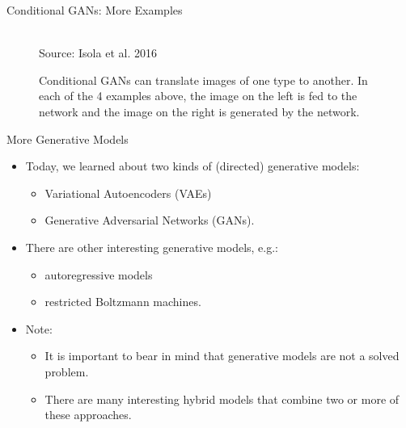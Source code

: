 \begin{frame} {Conditional GANs: More Examples}
  \begin{figure}
    \centering
       \tiny{\\Source: Isola et al. 2016}
       \caption{\footnotesize Conditional GANs can translate images of one type to another. In each of the 4 examples above, the image on the left is fed to the network and the image on the right is generated by the network.}
 \end{figure}
\end{frame}


\begin{frame} {More Generative Models}
  \begin{itemize}
   \vspace{8mm}
   \item Today, we learned about two kinds of (directed) generative models:
      \begin{itemize}
      \vspace{-0.4cm}
        \item Variational Autoencoders (VAEs)
        \item Generative Adversarial Networks (GANs).
      \end{itemize}
   \item There are other interesting generative models, e.g.:
      \begin{itemize}
        \item autoregressive models
        \item restricted Boltzmann machines.
      \end{itemize}
    \item Note:
      \begin{itemize}
        \item It is important to bear in mind that generative models are not a solved problem.
        \item There are many interesting hybrid models that combine two or more of these approaches.
      \end{itemize}
  \end{itemize}
\end{frame}

